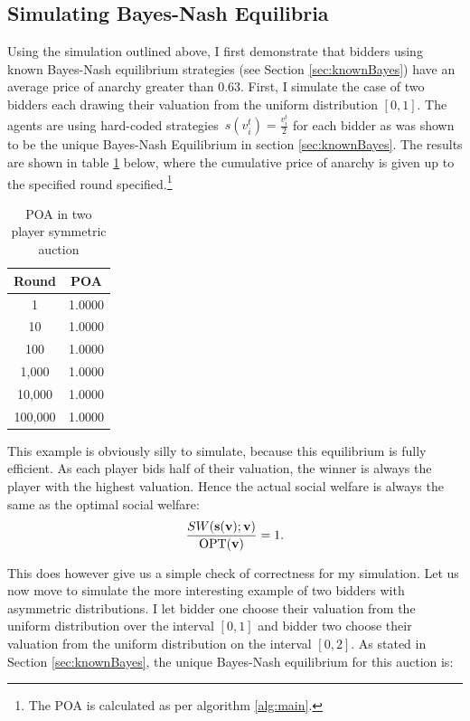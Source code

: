\documentclass[12pt,twoside]{reedthesis}
\begin{document}
\subsection{Simulating Bayes-Nash Equilibria}
Using the simulation outlined above, I first demonstrate that bidders using known Bayes-Nash equilibrium strategies (see Section \ref{sec:knownBayes}) have an average price of anarchy greater than $0.63$. First, I simulate the case of two bidders each drawing their valuation from the uniform distribution $[0,1]$. The agents are using hard-coded strategies~$s(v^t_i) = \frac{v^t_i}{2}$ for each bidder as was shown to be the unique Bayes-Nash Equilibrium in section \ref{sec:knownBayes}. The results are shown in table \ref{table:1} below, where the cumulative price of anarchy is given up to the specified round specified.\footnote{The POA is calculated as per algorithm \ref{alg:main}. %
}

\begin{table}[h!]
\begin{center}
\begin{tabular}{ |c|c| }
	\hline
	Round & POA \\
	\hline
	1 & 1.0000 \\
	10 & 1.0000 \\
	100 & 1.0000 \\
	1,000 & 1.0000 \\
	10,000 & 1.0000 \\
	100,000 & 1.0000 \\
	\hline
\end{tabular}
\caption{POA in two player symmetric auction}
\label{table:1}
\end{center} 
\end{table}

This example is obviously silly to simulate, because this equilibrium is fully efficient. As each player bids half of their valuation, the winner is always the player with the highest valuation. Hence the actual social welfare is always the same as the optimal social welfare: $$\frac{SW(\textbf{s}(\textbf{v}); \textbf{v})}{\text{OPT}(\textbf{v})} = 1.$$

This does however give us a simple check of correctness for my simulation. Let us now move to simulate the more interesting example of two bidders with asymmetric distributions. I let bidder one choose their valuation from the uniform distribution over the interval $[0,1]$ and bidder two choose their valuation from the uniform distribution on the interval $[0,2]$. As stated in Section \ref{sec:knownBayes}, the unique Bayes-Nash equilibrium for this auction is:
\end{document}
